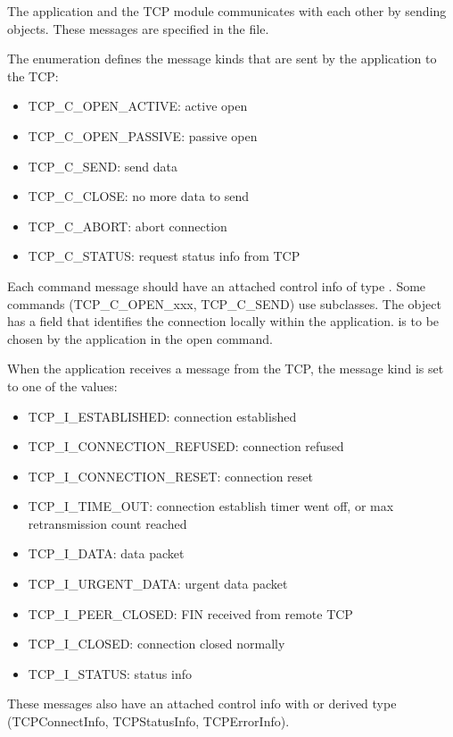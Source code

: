 The application and the TCP module communicates with each other
by sending  objects. These messages are specified
in the  file.

The  enumeration defines the message kinds
that are sent by the application to the TCP:
\begin{itemize}
  \item TCP\_C\_OPEN\_ACTIVE: active open
  \item TCP\_C\_OPEN\_PASSIVE: passive open
  \item TCP\_C\_SEND: send data
  \item TCP\_C\_CLOSE: no more data to send
  \item TCP\_C\_ABORT: abort connection
  \item TCP\_C\_STATUS: request status info from TCP
\end{itemize}

Each command message should have an attached control info of type .
Some commands (TCP\_C\_OPEN\_xxx, TCP\_C\_SEND) use subclasses.
The  object has a  field that identifies the
connection locally within the application.  is to be chosen by the
application in the open command.

When the application receives a message from the TCP, the message kind is
set to one of the  values:
\begin{itemize}
  \item TCP\_I\_ESTABLISHED: connection established
  \item TCP\_I\_CONNECTION\_REFUSED: connection refused
  \item TCP\_I\_CONNECTION\_RESET: connection reset
  \item TCP\_I\_TIME\_OUT: connection establish timer went off, or max retransmission count reached
  \item TCP\_I\_DATA: data packet
  \item TCP\_I\_URGENT\_DATA: urgent data packet
  \item TCP\_I\_PEER\_CLOSED: FIN received from remote TCP
  \item TCP\_I\_CLOSED: connection closed normally
  \item TCP\_I\_STATUS: status info
\end{itemize}

These messages also have an attached control info with 
or derived type (TCPConnectInfo, TCPStatusInfo, TCPErrorInfo).

